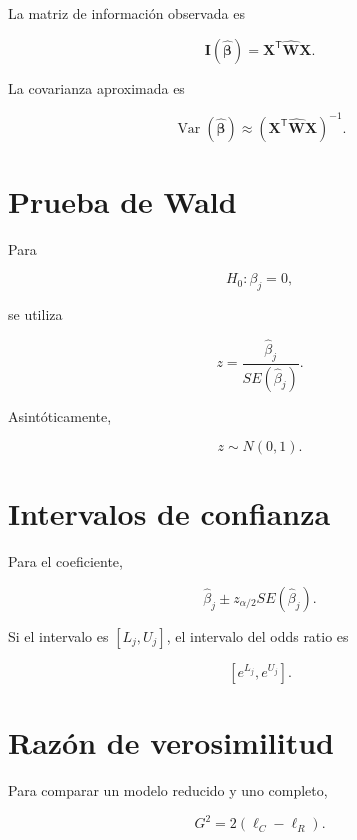 \documentclass[
  spanish,
  10.5pt,
  letterpaper,
  DIV=11,
  numbers=noendperiod,
  oneside,
  open=any]{scrreprt}
\theoremstyle{definition}
\theoremstyle{definition}
\theoremstyle{plain}
\theoremstyle{remark}
\begin{document}

La matriz de información observada es

\[
\mathbf{I}
(
\widehat{\boldsymbol{\beta}}
)
=
\mathbf{X}^{\mathsf T}
\widehat{\mathbf{W}}
\mathbf{X}.
\]

La covarianza aproximada es

\[
\operatorname{Var}
(
\widehat{\boldsymbol{\beta}}
)
\approx
\left(
\mathbf{X}^{\mathsf T}
\widehat{\mathbf{W}}
\mathbf{X}
\right)^{-1}.
\]

\section*{Prueba de Wald}\label{prueba-de-wald}


Para

\[
H_0:\beta_j=0,
\]

se utiliza

\[
z
=
\frac{\widehat{\beta}_j}
{SE(\widehat{\beta}_j)}.
\]

Asintóticamente,

\[
z\sim N(0,1).
\]

\section*{Intervalos de confianza}\label{intervalos-de-confianza-1}


Para el coeficiente,

\[
\widehat{\beta}_j
\pm
z_{\alpha/2}
SE(\widehat{\beta}_j).
\]

Si el intervalo es \([L_j,U_j]\), el intervalo del odds ratio es

\[
[e^{L_j},e^{U_j}].
\]

\section*{Razón de verosimilitud}\label{razuxf3n-de-verosimilitud}


Para comparar un modelo reducido y uno completo,

\[
G^2
=
2(\ell_C-\ell_R).
\]
\end{document}
